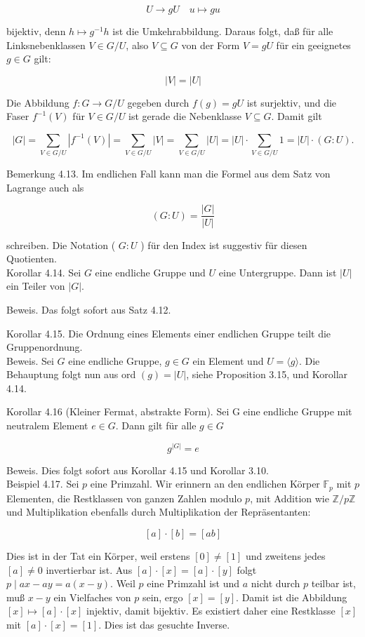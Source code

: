 \documentclass[10pt, letterpaper]{article}
\begin{document}
$$
U \rightarrow g U \quad u \mapsto g u
$$

bijektiv, denn $h \mapsto g^{-1} h$ ist die Umkehrabbildung. Daraus folgt, daß für alle Linksnebenklassen $V \in G / U$, also $V \subseteq G$ von der Form $V=g U$ für ein geeignetes $g \in G$ gilt:

$$
|V|=|U|
$$

Die Abbildung $f: G \rightarrow G / U$ gegeben durch $f(g)=g U$ ist surjektiv, und die Faser $f^{-1}(V)$ für $V \in G / U$ ist gerade die Nebenklasse $V \subseteq G$. Damit gilt

$$
|G|=\sum_{V \in G / U}\left|f^{-1}(V)\right|=\sum_{V \in G / U}|V|=\sum_{V \in G / U}|U|=|U| \cdot \sum_{V \in G / U} 1=|U| \cdot(G: U) .
$$

Bemerkung 4.13. Im endlichen Fall kann man die Formel aus dem Satz von Lagrange auch als

$$
(G: U)=\frac{|G|}{|U|}
$$

schreiben. Die Notation ( $G: U$ ) für den Index ist suggestiv für diesen Quotienten.\\
Korollar 4.14. Sei $G$ eine endliche Gruppe und $U$ eine Untergruppe. Dann ist $|U|$ ein Teiler von $|G|$.

Beweis. Das folgt sofort aus Satz 4.12.

Korollar 4.15. Die Ordnung eines Elements einer endlichen Gruppe teilt die Gruppenordnung.\\
Beweis. Sei $G$ eine endliche Gruppe, $g \in G$ ein Element und $U=\langle g\rangle$. Die Behauptung folgt nun aus ord $(g)=|U|$, siehe Proposition 3.15, und Korollar 4.14.

Korollar 4.16 (Kleiner Fermat, abstrakte Form). Sei G eine endliche Gruppe mit neutralem Element $e \in G$. Dann gilt für alle $g \in G$

$$
g^{|G|}=e
$$

Beweis. Dies folgt sofort aus Korollar 4.15 und Korollar 3.10.\\
Beispiel 4.17. Sei $p$ eine Primzahl. Wir erinnern an den endlichen Körper $\mathbb{F}_{p}$ mit $p$ Elementen, die Restklassen von ganzen Zahlen modulo $p$, mit Addition wie $\mathbb{Z} / p \mathbb{Z}$ und Multiplikation ebenfalls durch Multiplikation der Repräsentanten:

$$
[a] \cdot[b]=[a b]
$$

Dies ist in der Tat ein Körper, weil erstens $[0] \neq[1]$ und zweitens jedes $[a] \neq 0$ invertierbar ist. Aus $[a] \cdot[x]=[a] \cdot[y]$ folgt $p \mid a x-a y=a(x-y)$. Weil $p$ eine Primzahl ist und $a$ nicht durch $p$ teilbar ist, muß $x-y$ ein Vielfaches von $p$ sein, ergo $[x]=[y]$. Damit ist die Abbildung $[x] \mapsto[a] \cdot[x]$ injektiv, damit bijektiv. Es existiert daher eine Restklasse $[x]$ mit $[a] \cdot[x]=[1]$. Dies ist das gesuchte Inverse.
\end{document}
